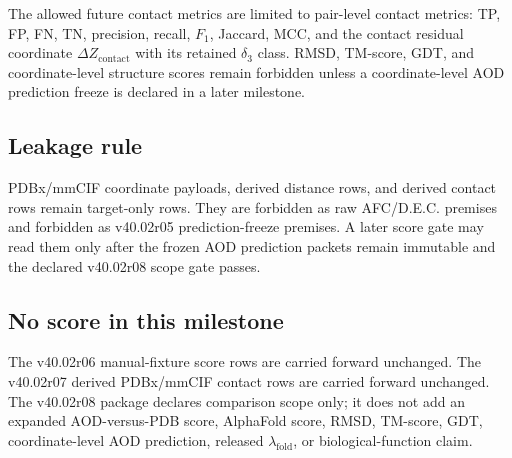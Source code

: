 The allowed future contact metrics are limited to pair-level contact metrics: TP, FP, FN, TN, precision, recall, $F_1$, Jaccard, MCC, and the contact residual coordinate $\Delta Z_{\mathrm{contact}}$ with its retained $\delta_3$ class. RMSD, TM-score, GDT, and coordinate-level structure scores remain forbidden unless a coordinate-level AOD prediction freeze is declared in a later milestone.

\subsection{Leakage rule}

PDBx/mmCIF coordinate payloads, derived distance rows, and derived contact rows remain target-only rows. They are forbidden as raw AFC/D.E.C. premises and forbidden as v40.02r05 prediction-freeze premises. A later score gate may read them only after the frozen AOD prediction packets remain immutable and the declared v40.02r08 scope gate passes.

\subsection{No score in this milestone}

The v40.02r06 manual-fixture score rows are carried forward unchanged. The v40.02r07 derived PDBx/mmCIF contact rows are carried forward unchanged. The v40.02r08 package declares comparison scope only; it does not add an expanded AOD-versus-PDB score, AlphaFold score, RMSD, TM-score, GDT, coordinate-level AOD prediction, released $\lambda_{\mathrm{fold}}$, or biological-function claim.

